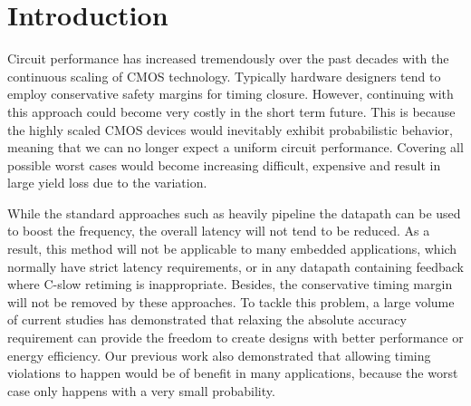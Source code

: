 \documentclass{acm_proc_article-sp}
\begin{document}

\section{Introduction}
Circuit performance has increased tremendously over the past decades with the continuous scaling of CMOS technology. Typically hardware designers tend to employ conservative safety margins for timing closure. However, continuing with this approach could become very costly in the short term future. This is because the highly scaled CMOS devices would inevitably exhibit probabilistic behavior, meaning that we can no longer expect a uniform circuit performance. Covering all possible worst cases would become increasing difficult, expensive and result in large yield loss due to the variation.
 
While the standard approaches such as heavily pipeline the datapath can be used to boost the frequency, the overall latency will not tend to be reduced. As a result, this method will not be applicable to many embedded applications, which normally have strict latency requirements, or in any datapath containing feedback where C-slow retiming is inappropriate. Besides, the conservative timing margin will not be removed by these approaches. To tackle this problem, a large volume of current studies has demonstrated that relaxing the absolute accuracy requirement can provide the freedom to create designs with better performance or energy efficiency. Our previous work also demonstrated that allowing timing violations to happen would be of benefit in many applications, because the worst case only happens with a very small probability.
\end{document}
